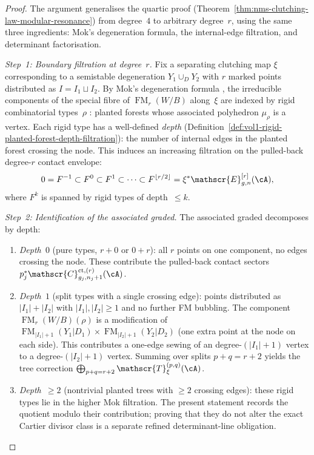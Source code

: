 \begin{proof}
The argument generalises the quartic proof
(Theorem~\ref{thm:nms-clutching-law-modular-resonance}) from
degree~$4$ to arbitrary degree~$r$, using the same three ingredients:
Mok's degeneration formula, the internal-edge filtration, and
determinant factorisation.

\emph{Step~1: Boundary filtration at degree~$r$.}
Fix a separating clutching map $\xi$ corresponding to a semistable
degeneration $Y_1 \cup_D Y_2$ with $r$ marked points distributed
as $I = I_1 \sqcup I_2$.
By Mok's degeneration formula \cite[Corollary~5.3.4]{Mok25},
the irreducible components of the special fibre of
$\operatorname{FM}_r(W/B)$ along~$\xi$ are indexed by rigid
combinatorial types~$\rho$ \cite[Definition~4.7.1]{Mok25}:
planted forests whose associated polyhedron $\mu_\rho$ is a vertex.
Each rigid type has a well-defined \emph{depth}
(Definition~\ref{def:vol1-rigid-planted-forest-depth-filtration}):
the number of internal edges in the planted forest crossing the
node. This induces an increasing filtration on the pulled-back
degree-$r$ contact envelope:
\[
0
= F^{-1}
\subset F^0
\subset F^1
\subset \cdots
\subset F^{\lfloor r/2 \rfloor}
= \xi^*\mathscr{E}^{[r]}_{g,n}(\cA),
\]
where $F^k$ is spanned by rigid types of depth~$\le k$.

\emph{Step~2: Identification of the associated graded.}
The associated graded decomposes by depth:
\begin{enumerate}[label=\textup{(\Alph*)}]
\item \emph{Depth~$0$} (pure types, $r{+}0$ or $0{+}r$): all $r$
 points on one component, no edges crossing the node. These
 contribute the pulled-back contact sectors
 $p_j^*\mathscr{C}^{\mathrm{ct},(r)}_{g_j,n_j+1}(\cA)$.
\item \emph{Depth~$1$} (split types with a single crossing edge):
 points distributed as $|I_1|{+}|I_2|$ with
 $|I_1|, |I_2| \ge 1$ and no further FM bubbling. The component
 $\operatorname{FM}_r(W/B)(\rho)$ is a modification of
 $\operatorname{FM}_{|I_1|+1}(Y_1|D_1)
 \times \operatorname{FM}_{|I_2|+1}(Y_2|D_2)$
 (one extra point at the node on each side).
 This contributes a one-edge sewing of an
 degree-$(|I_1|{+}1)$ vertex to a degree-$(|I_2|{+}1)$
 vertex. Summing over splits $p + q = r + 2$ yields the
 tree correction
 $\bigoplus_{p+q=r+2}\mathscr{T}^{(p,q)}_\xi(\cA)$.
\item \emph{Depth~$\ge 2$} (nontrivial planted trees with $\ge 2$
 crossing edges): these rigid types lie in the higher Mok filtration.
 The present statement records the quotient modulo their contribution;
 proving that they do not alter the exact Cartier divisor class is a
 separate refined determinant-line obligation.
\end{enumerate}


\end{proof}
